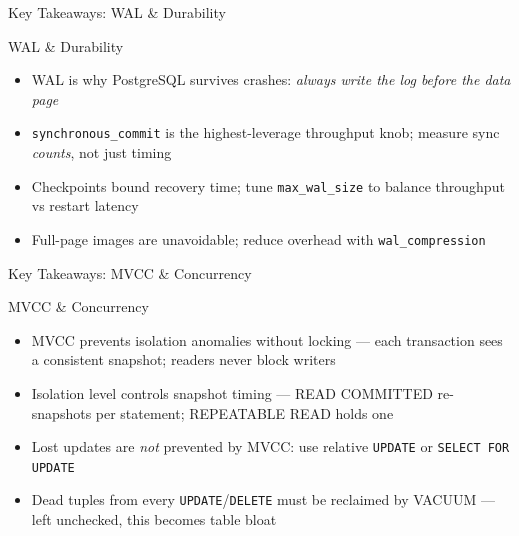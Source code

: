 \documentclass[aspectratio=169,10pt]{beamer}
\begin{document}
\begin{frame}{Key Takeaways: WAL \& Durability}

  \begin{block}{WAL \& Durability}
    \begin{itemize}\small
      \item WAL is why PostgreSQL survives crashes:
            \textit{always write the log before the data page}
      \item \texttt{synchronous\_commit} is the highest-leverage throughput
            knob; measure sync \textit{counts}, not just timing
      \item Checkpoints bound recovery time; tune \texttt{max\_wal\_size}
            to balance throughput vs restart latency
      \item Full-page images are unavoidable; reduce overhead with
            \texttt{wal\_compression}
    \end{itemize}
  \end{block}

\end{frame}

\begin{frame}{Key Takeaways: MVCC \& Concurrency}

  \begin{block}{MVCC \& Concurrency}
    \begin{itemize}\small
      \item MVCC prevents isolation anomalies without locking ---
            each transaction sees a consistent snapshot; readers never block writers
      \item Isolation level controls snapshot timing ---
            READ COMMITTED re-snapshots per statement; REPEATABLE READ holds one
      \item Lost updates are \textit{not} prevented by MVCC: use relative
            \texttt{UPDATE} or \texttt{SELECT FOR UPDATE}
      \item Dead tuples from every \texttt{UPDATE}/\texttt{DELETE} must be
            reclaimed by VACUUM --- left unchecked, this becomes table bloat
    \end{itemize}
  \end{block}

\end{frame}
\end{document}
